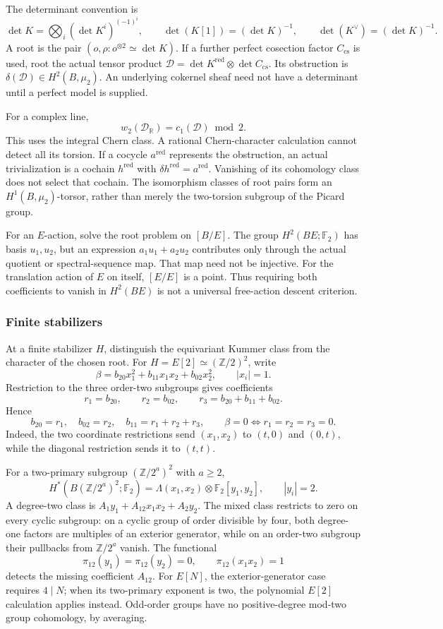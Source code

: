 The determinant convention is
\[
 \det K=\bigotimes_i(\det K^i)^{(-1)^i},\qquad
 \det(K[1])=(\det K)^{-1},\qquad
 \det(K^\vee)=(\det K)^{-1}.
\]
A root is the pair \((o,\rho:o^{\otimes2}\simeq\det K)\).
If a further perfect cosection factor \(C_{\mathrm{cs}}\) is
used, root the actual tensor product
\(\mathscr D=\det K^{\mathrm{red}}\otimes\det C_{\mathrm{cs}}\).
Its obstruction is \(\delta(\mathscr D)\in H^2(B,\mu_2)\).
An underlying cokernel sheaf need not have a determinant until a
perfect model is supplied.

For a complex line,
\[
 w_2(\mathscr D_{\mathbb R})=c_1(\mathscr D)\bmod2.
\]
This uses the integral Chern class. A rational Chern-character
calculation cannot detect all its torsion. If a cocycle
\(a^{\mathrm{red}}\) represents the obstruction, an actual
trivialization is a cochain \(h^{\mathrm{red}}\) with
\(\delta h^{\mathrm{red}}=a^{\mathrm{red}}\).
Vanishing of its cohomology class does not select that cochain.
The isomorphism classes of root pairs form an
\(H^1(B,\mu_2)\)-torsor, rather than merely the two-torsion subgroup
of the Picard group.

For an \(E\)-action, solve the root problem on \([B/E]\).
The group \(H^2(BE;\mathbb F_2)\) has basis \(u_1,u_2\), but
an expression \(a_1u_1+a_2u_2\) contributes only through the
actual quotient or spectral-sequence map. That map need not be
injective. For the translation action of \(E\) on itself,
\([E/E]\) is a point. Thus requiring both coefficients to vanish
in \(H^2(BE)\) is not a universal free-action descent criterion.

\subsubsection*{Finite stabilizers}

At a finite stabilizer \(H\), distinguish the equivariant Kummer
class from the character of the chosen root. For
\(H=E[2]\simeq(\mathbb Z/2)^2\), write
\[
 \beta=b_{20}x_1^2+b_{11}x_1x_2+b_{02}x_2^2,
 \qquad |x_i|=1.
\]
Restriction to the three order-two subgroups gives coefficients
\[
 r_1=b_{20},\qquad r_2=b_{02},\qquad
 r_3=b_{20}+b_{11}+b_{02}.
\]
Hence
\[
 b_{20}=r_1,\quad b_{02}=r_2,\quad b_{11}=r_1+r_2+r_3,
 \qquad \beta=0\Longleftrightarrow r_1=r_2=r_3=0.
\]
Indeed, the two coordinate restrictions send \((x_1,x_2)\) to
\((t,0)\) and \((0,t)\), while the diagonal restriction sends it
to \((t,t)\).

For a two-primary subgroup \((\mathbb Z/2^a)^2\) with
\(a\ge2\),
\[
 H^*(B(\mathbb Z/2^a)^2;\mathbb F_2)
 =\Lambda(x_1,x_2)\otimes\mathbb F_2[y_1,y_2],
 \qquad |y_i|=2.
\]
A degree-two class is
\(A_1y_1+A_{12}x_1x_2+A_2y_2\).
The mixed class restricts to zero on every cyclic subgroup: on a
cyclic group of order divisible by four, both degree-one factors
are multiples of an exterior generator, while on an order-two
subgroup their pullbacks from \(\mathbb Z/2^a\) vanish.
The functional
\[
 \pi_{12}(y_1)=\pi_{12}(y_2)=0,\qquad
 \pi_{12}(x_1x_2)=1
\]
detects the missing coefficient \(A_{12}\).
For \(E[N]\), the exterior-generator case requires \(4\mid N\);
when its two-primary exponent is two, the polynomial
\(E[2]\) calculation applies instead.
Odd-order groups have no positive-degree mod-two group cohomology,
by averaging.

